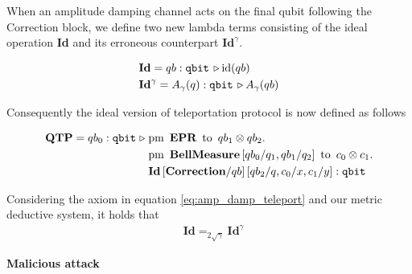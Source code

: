 \begin{example}
When an amplitude damping channel acts on the final qubit following the Correction block, we define two new lambda terms consisting of the ideal operation \textbf{Id} and its erroneous counterpart  $\textbf{Id}^{\gamma}$.

\begin{align}\label{eq:id_error_teleport}
  &\textbf{Id} = qb:\mathtt{qbit} \, \triangleright \mathrm{id} (qb) \\
  & \textbf{Id}^{\gamma} = A_{\gamma} (q):\mathtt{qbit} \, \triangleright  A_{\gamma} (qb)
\end{align}


Consequently the ideal version of teleportation protocol is now defined as follows

\begin{align*} 
  \textbf{QTP} = qb_{0}: \mathtt{qbit}\hspace{3 pt} \triangleright \hspace{3 pt} & \text{pm} \hspace{5pt} \textbf{EPR} \hspace{5pt} \text{to} \hspace{5pt}  qb_{1} \otimes qb_{2}.  \notag \\
     & \text{pm}\hspace{5pt} \textbf{BellMeasure}\, [qb_0/q_1,qb_{1}/q_2] \hspace{5pt}  \text{to} \hspace{5pt} c_{0}\otimes c_{1} . \notag \\
     & \textbf{Id} \, [ \textbf{Correction}/qb] \, [qb_{2}/q,c_{0}/x, c_{1}/y] 
     : \mathtt{qbit}  
 \end{align*}

 Considering the axiom in equation \eqref{eq:amp_damp_teleport} and our metric deductive system, it holds that 
\begin{align*}
  &\textbf{Id}=_{2 \sqrt{\gamma}} \textbf{Id}^{\gamma}
\end{align*}

\textbf{Malicious attack}


\end{example}
